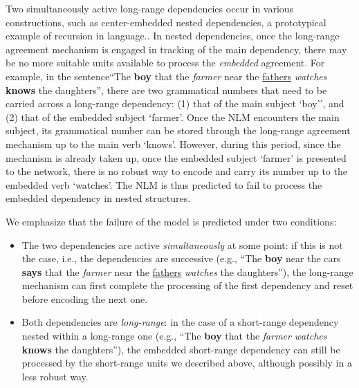 Two simultaneously active long-range dependencies occur in various constructions, such as center-embedded nested dependencies, a prototypical example of recursion in language.. In nested dependencies, once the long-range agreement mechanism is engaged in tracking of the main dependency, there may be no more suitable units available to process the \textit{embedded} agreement. For example, in the sentence``The \textbf{boy} that the \textit{farmer} near the \underline{fathers} \textit{watches} \textbf{knows} the daughters'', there are two grammatical numbers that need to be carried across a long-range dependency: (1) that of the main subject `boy'', and (2) that of the embedded subject `farmer'. Once the NLM  encounters the main subject, its grammatical number can be stored through the long-range agreement mechanism up to the main verb `knows'. However, during this period, since the mechanism is already taken up, once the embedded subject `farmer' is presented to the network, there is no robust way to encode and carry its number up to the embedded verb `watches'. The NLM is thus predicted to fail to process the embedded dependency in nested structures.

We emphasize that the failure of the model is predicted under two conditions:
\begin{itemize}
	\item The two dependencies are active \textit{simultaneously} at some point: if this is not the case, i.e., the dependencies are successive (e.g., ``The \textbf{boy} near the cars \textbf{says} that the \textit{farmer} near the \underline{fathers} \textit{watches} the daughters''), the long-range mechanism can first complete the processing of the first dependency and reset before encoding the next one. 

        \item Both dependencies are \textit{long-range}: in the case
          of a short-range dependency nested within a long-range one
          (e.g., ``The \textbf{boy} that the \textit{farmer}
          \textit{watches} \textbf{knows} the daughters''), the
          embedded short-range dependency can still be processed by
          the short-range units we described above, although possibly
          in a less robust way.
\end{itemize}

